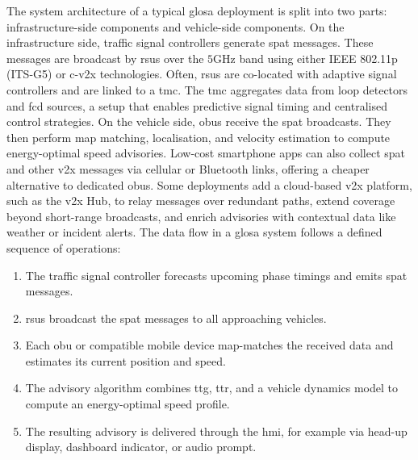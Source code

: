 The system architecture of a typical \ac{glosa} deployment is split into two parts: infrastructure-side components and vehicle-side components. On the infrastructure side, traffic signal controllers generate \ac{spat} messages. These messages are broadcast by \acp{rsu} over the $\unit{5\giga\hertz}$ band using either IEEE 802.11p (ITS-G5) or \ac{c-v2x} technologies. Often, \acp{rsu} are co-located with adaptive signal controllers and are linked to a \ac{tmc}. The \ac{tmc} aggregates data from loop detectors and \ac{fcd} sources, a setup that enables predictive signal timing and centralised control strategies. On the vehicle side, \acp{obu} receive the \ac{spat} broadcasts. They then perform \ac{map} matching, localisation, and velocity estimation to compute energy-optimal speed advisories. \cite{Sambeek2015} Low-cost smartphone apps can also collect \ac{spat} and other \ac{v2x} messages via cellular or Bluetooth links, offering a cheaper alternative to dedicated \acp{obu}. \cite{Gao2016} Some deployments add a cloud-based \ac{v2x} platform, such as the \ac{v2x} Hub, to relay messages over redundant paths, extend coverage beyond short-range broadcasts, and enrich advisories with contextual data like weather or incident alerts. \cite{Hadi2023}
\mynewline
The data flow in a \ac{glosa} system follows a defined sequence of operations:

\begin{enumerate}[leftmargin=*, label=\textbf{Step \arabic*:}]
  \item The traffic signal controller forecasts upcoming phase timings and emits \ac{spat} messages.
  \item \acp{rsu} broadcast the \ac{spat} messages to all approaching vehicles.
  \item Each \ac{obu} or compatible mobile device \ac{map}-matches the received data and estimates its current position and speed.
  \item The advisory algorithm combines \ac{ttg}, \ac{ttr}, and a vehicle dynamics model to compute an energy-optimal speed profile.
  \item The resulting advisory is delivered through the \ac{hmi}, for example via head-up display, dashboard indicator, or audio prompt.
\end{enumerate}

